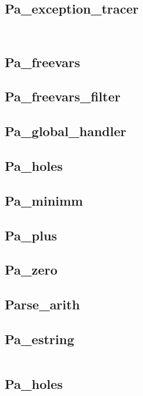 \subsection{Pa\_exception\_tracer}
\inputminted[fontsize=\scriptsize]{ocaml}{camlp4/examples/pa_exception_tracer.ml}
\inputminted[fontsize=\scriptsize, fontsize=\scriptsize,
]{ocaml}{camlp4/examples/test_pa_exception_tracer.ml}


\subsection{Pa\_freevars}


\subsection{Pa\_freevars\_filter}


\subsection{Pa\_global\_handler}

\subsection{Pa\_holes}

\subsection{Pa\_minimm}


\subsection{Pa\_plus}

\subsection{Pa\_zero}

\subsection{Parse\_arith}


\subsection{Pa\_estring}
\inputminted[fontsize=\scriptsize]{ocaml}{camlp4/example/pa_estring.ml}


\subsection{Pa\_holes}
